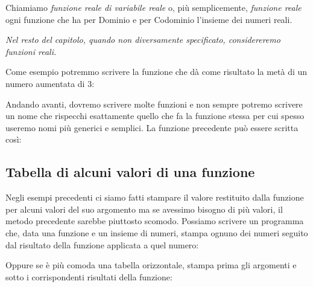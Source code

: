\begin{definizione}
Chiamiamo \emph{funzione reale di variabile reale} o, più 
semplicemente, \emph{funzione reale} ogni funzione che ha per Dominio e 
per Codominio l'insieme dei numeri reali.
\end{definizione}

\emph{Nel resto del capitolo, quando non diversamente specificato, 
considereremo funzioni reali.}

\begin{esempio}
Come esempio potremmo scrivere la funzione che dà come risultato la metà di 
un numero aumentata di 3:


\end{esempio}

Andando avanti, dovremo scrivere molte funzioni e non sempre potremo 
scrivere un nome che rispecchi esattamente quello che fa la funzione stessa 
per cui spesso useremo nomi più generici e semplici. 
La funzione precedente può essere scritta così:



\subsection{Tabella di alcuni valori di una funzione}

Negli esempi precedenti ci siamo fatti stampare il valore restituito dalla 
funzione per alcuni valori del suo argomento ma se avessimo bisogno di più 
valori, il metodo precedente sarebbe piuttosto scomodo. 
Possiamo scrivere un programma che, data una funzione e un insieme di numeri, 
stampa ognuno dei numeri seguito dal risultato della funzione 
applicata a quel numero:


Oppure se è più comoda una tabella orizzontale, stampa prima gli 
argomenti e sotto i corrispondenti risultati della funzione:


